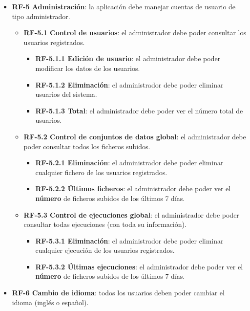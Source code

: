 \begin{itemize}
    \item \textbf{RF-5 Administración}: la aplicación debe manejar cuentas de
    usuario de tipo administrador.
    \begin{itemize}
        \item \textbf{RF-5.1 Control de usuarios}: el administrador debe poder
        consultar los usuarios registrados.
        \begin{itemize}
            \item \textbf{RF-5.1.1 Edición de usuario}: el administrador debe
            poder modificar los datos de los usuarios.
            \item \textbf{RF-5.1.2 Eliminación}: el administrador debe poder
            eliminar usuarios del sistema.
            \item \textbf{RF-5.1.3 Total}: el administrador debe poder ver el
            número total de usuarios.
        \end{itemize}
        \item \textbf{RF-5.2 Control de conjuntos de datos global}: el
        administrador debe poder consultar todos los ficheros subidos.
        \begin{itemize}          
            \item \textbf{RF-5.2.1 Eliminación}: el administrador debe poder
            eliminar cualquier fichero de los usuarios registrados.
            \item \textbf{RF-5.2.2 Últimos ficheros}: el administrador debe
            poder ver el \textbf{número} de ficheros subidos de los últimos 7
            días.
        \end{itemize}
        \item \textbf{RF-5.3 Control de ejecuciones global}: el administrador
        debe poder consultar todas ejecuciones (con toda su información).
        \begin{itemize}          
            \item \textbf{RF-5.3.1 Eliminación}: el administrador debe poder
            eliminar cualquier ejecución de los usuarios registrados.
            \item \textbf{RF-5.3.2 Últimas ejecuciones}: el administrador debe
            poder ver el \textbf{número} de ficheros subidos de los últimos 7
            días.
        \end{itemize}
    \end{itemize}

    \item \textbf{RF-6 Cambio de idioma}: todos los usuarios deben poder cambiar
    el idioma (inglés o español).

\end{itemize}

